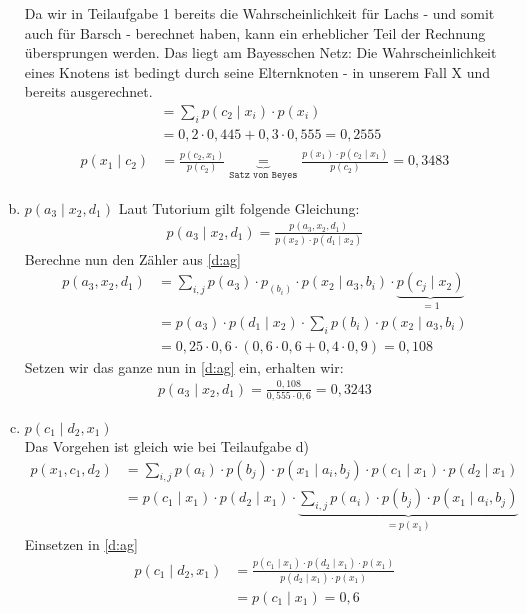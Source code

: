 \begin{enumerate}[a)]
	Da wir in Teilaufgabe 1 bereits die Wahrscheinlichkeit für Lachs - und somit auch für Barsch - berechnet haben, kann ein erheblicher Teil der Rechnung übersprungen werden. Das liegt am Bayesschen Netz: Die Wahrscheinlichkeit eines Knotens ist bedingt durch seine Elternknoten - in unserem Fall X und bereits ausgerechnet.
	\begin{align*}
		&= \sum_{i} p(c_2\mid x_i)  \cdot p(x_i)\\
		&= 0,2\cdot 0,445 + 0,3 \cdot 0,555 = 0,2555 
	\end{align*}
	\begin{align*}
		p(x_1\mid c_2) &= \frac{p(c_2,x_1)}{p(c_2)}\underbrace{=}_{\texttt{Satz von Beyes}} \frac{p(x_1)\cdot p(c_2\mid x_1)}{p(c_2)} = 0,3483
	\end{align*}
	\item $p(a_3\mid x_2,d_1)$
	Laut Tutorium gilt folgende Gleichung:
	\begin{align}
		p(a_3\mid x_2,d_1) = \frac{p(a_3,x_2,d_1)}{p(x_2)\cdot p(d_1\mid x_2)}\label{d:ag}
	\end{align}
	Berechne nun den Zähler aus \ref{d:ag}
	\begin{align*}
	p(a_3,x_2,d_1) &= \sum_{i,j} p(a_3)\cdot p_(b_i) \cdot p(x_2\mid a_3,b_i) \cdot \underbrace{p(c_j\mid x_2)}_{=1}\\
	&= p(a_3) \cdot p(d_1\mid x_2) \cdot \sum_{i} p(b_i) \cdot p(x_2\mid a_3,b_i)\\
	&= 0,25 \cdot 0,6 \cdot (0,6\cdot 0,6 + 0,4 \cdot 0,9) = 0,108
	\end{align*}
	Setzen wir das ganze nun in \ref{d:ag} ein, erhalten wir:
	\begin{align*}
		p(a_3\mid x_2,d_1) = \frac{0,108}{0,555\cdot 0,6} = 0,3243
	\end{align*}
	\item $p(c_1\mid d_2,x_1)$\\
	Das Vorgehen ist gleich wie bei Teilaufgabe d)
	\begin{align*}
		p(x_1,c_1,d_2) &= \sum_{i,j} p(a_i)\cdot p(b_j) \cdot p(x_1\mid a_i,b_j) \cdot p(c_1\mid x_1)\cdot p(d_2\mid x_1)\\
		&=p(c_1\mid x_1)\cdot p(d_2\mid x_1) \cdot \underbrace{\sum_{i,j} p(a_i) \cdot p(b_j) \cdot p(x_1\mid a_i,b_j)}_{=p(x_1)}
	\end{align*}
	Einsetzen in \ref{d:ag}
	\begin{align*}
	p(c_1\mid d_2,x_1) &= \frac{p(c_1\mid x_1)\cdot p(d_2\mid x_1)\cdot p(x_1)}{p(d_2\mid x_1)\cdot p(x_1)}\\
	&= p(c_1\mid x_1) = 0,6
	\end{align*}
	
\end{enumerate}